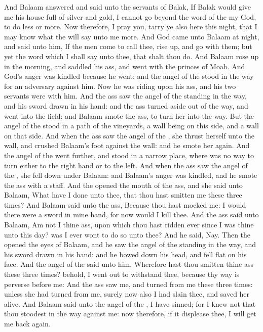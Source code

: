 \begin{biblechapter}
\verse And Balaam answered and said unto the servants of Balak, If Balak would give me his house full of silver and gold, I cannot go beyond the word of the \LORD my God, to do less or more.
\verse Now therefore, I pray you, tarry ye also here this night, that I may know what the \LORD will say unto me more.
\verse And God came unto Balaam at night, and said unto him, If the men come to call thee, rise up, and go with them; but yet the word which I shall say unto thee, that shalt thou do.
 And Balaam rose up in the morning, and saddled his ass, and went with the princes of Moab.
\verse And God's anger was kindled because he went: and the angel of the \LORD stood in the way for an adversary against him. Now he was riding upon his ass, and his two servants were with him.
\verse And the ass saw the angel of the \LORD standing in the way, and his sword drawn in his hand: and the ass turned aside out of the way, and went into the field: and Balaam smote the ass, to turn her into the way.
\verse But the angel of the \LORD stood in a path of the vineyards, a wall being on this side, and a wall on that side.
\verse And when the ass saw the angel of the \LORD, she thrust herself unto the wall, and crushed Balaam's foot against the wall: and he smote her again.
\verse And the angel of the \LORD went further, and stood in a narrow place, where was no way to turn either to the right hand or to the left.
\verse And when the ass saw the angel of the \LORD, she fell down under Balaam: and Balaam's anger was kindled, and he smote the ass with a staff.
\verse And the \LORD opened the mouth of the ass, and she said unto Balaam, What have I done unto thee, that thou hast smitten me these three times?
\verse And Balaam said unto the ass, Because thou hast mocked me: I would there were a sword in mine hand, for now would I kill thee.
\verse And the ass said unto Balaam, Am not I thine ass, upon which thou hast ridden ever since I was thine unto this day? was I ever wont to do so unto thee? And he said, Nay.
\verse Then the \LORD opened the eyes of Balaam, and he saw the angel of the \LORD standing in the way, and his sword drawn in his hand: and he bowed down his head, and fell flat on his face.
\verse And the angel of the \LORD said unto him, Wherefore hast thou smitten thine ass these three times? behold, I went out to withstand thee, because thy way is perverse before me:
\verse And the ass saw me, and turned from me these three times: unless she had turned from me, surely now also I had slain thee, and saved her alive.
\verse And Balaam said unto the angel of the \LORD, I have sinned; for I knew not that thou stoodest in the way against me: now therefore, if it displease thee, I will get me back again.

\end{biblechapter}
